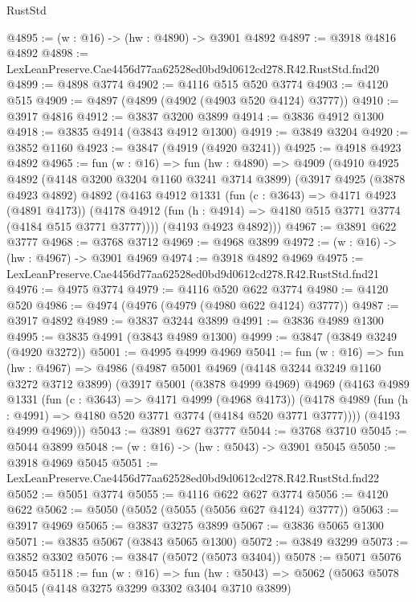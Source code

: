 \begin{lexlean}{RustStd}
\begin{coremodule}
@4895 := (w : @16) -> (hw : @4890) -> @3901 @4892
@4897 := @3918 @4816 @4892
@4898 := LexLeanPreserve.Cae4456d77aa62528ed0bd9d0612cd278.R42.RustStd.fnd20
@4899 := @4898 @3774
@4902 := @4116 @515 @520 @3774
@4903 := @4120 @515
@4909 := @4897 (@4899 (@4902 (@4903 @520 @4124) @3777))
@4910 := @3917 @4816
@4912 := @3837 @3200 @3899
@4914 := @3836 @4912 @1300
@4918 := @3835 @4914 (@3843 @4912 @1300)
@4919 := @3849 @3204
@4920 := @3852 @1160
@4923 := @3847 (@4919 (@4920 @3241))
@4925 := @4918 @4923 @4892
@4965 := fun (w : @16) =>
  fun (hw : @4890) =>
  @4909
    (@4910
      @4925
      @4892
      (@4148 @3200 @3204 @1160 @3241 @3714 @3899)
      (@3917
        @4925
        (@3878 @4923 @4892)
        @4892
        (@4163
          @4912
          @1331
          (fun (c : @3643) => @4171 @4923 (@4891 @4173))
          (@4178 @4912 (fun (h : @4914) => @4180 @515 @3771 @3774 (@4184 @515 @3771 @3777))))
        (@4193 @4923 @4892)))
@4967 := @3891 @622 @3777
@4968 := @3768 @3712
@4969 := @4968 @3899
@4972 := (w : @16) -> (hw : @4967) -> @3901 @4969
@4974 := @3918 @4892 @4969
@4975 := LexLeanPreserve.Cae4456d77aa62528ed0bd9d0612cd278.R42.RustStd.fnd21
@4976 := @4975 @3774
@4979 := @4116 @520 @622 @3774
@4980 := @4120 @520
@4986 := @4974 (@4976 (@4979 (@4980 @622 @4124) @3777))
@4987 := @3917 @4892
@4989 := @3837 @3244 @3899
@4991 := @3836 @4989 @1300
@4995 := @3835 @4991 (@3843 @4989 @1300)
@4999 := @3847 (@3849 @3249 (@4920 @3272))
@5001 := @4995 @4999 @4969
@5041 := fun (w : @16) =>
  fun (hw : @4967) =>
  @4986
    (@4987
      @5001
      @4969
      (@4148 @3244 @3249 @1160 @3272 @3712 @3899)
      (@3917
        @5001
        (@3878 @4999 @4969)
        @4969
        (@4163
          @4989
          @1331
          (fun (c : @3643) => @4171 @4999 (@4968 @4173))
          (@4178 @4989 (fun (h : @4991) => @4180 @520 @3771 @3774 (@4184 @520 @3771 @3777))))
        (@4193 @4999 @4969)))
@5043 := @3891 @627 @3777
@5044 := @3768 @3710
@5045 := @5044 @3899
@5048 := (w : @16) -> (hw : @5043) -> @3901 @5045
@5050 := @3918 @4969 @5045
@5051 := LexLeanPreserve.Cae4456d77aa62528ed0bd9d0612cd278.R42.RustStd.fnd22
@5052 := @5051 @3774
@5055 := @4116 @622 @627 @3774
@5056 := @4120 @622
@5062 := @5050 (@5052 (@5055 (@5056 @627 @4124) @3777))
@5063 := @3917 @4969
@5065 := @3837 @3275 @3899
@5067 := @3836 @5065 @1300
@5071 := @3835 @5067 (@3843 @5065 @1300)
@5072 := @3849 @3299
@5073 := @3852 @3302
@5076 := @3847 (@5072 (@5073 @3404))
@5078 := @5071 @5076 @5045
@5118 := fun (w : @16) =>
  fun (hw : @5043) =>
  @5062
    (@5063
      @5078
      @5045
      (@4148 @3275 @3299 @3302 @3404 @3710 @3899)

\end{coremodule}
\end{lexlean}
